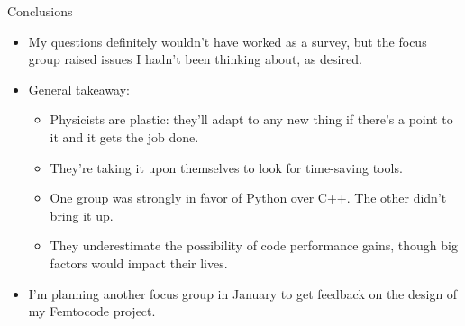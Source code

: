 \documentclass{beamer}
\begin{document}
\begin{frame}{Conclusions}
\vspace{0.25 cm}
\begin{itemize}\setlength{\itemsep}{0.5 cm}
\item My questions definitely wouldn't have worked as a survey, but the focus group raised issues I hadn't been thinking about, as desired.

\item General takeaway:
\begin{itemize}
\item Physicists are plastic: they'll adapt to any new thing if there's a point to it and it gets the job done.
\item They're taking it upon themselves to look for time-saving tools.
\item One group was strongly in favor of Python over C++. The other didn't bring it up.
\item They underestimate the possibility of code performance gains, though big factors would impact their lives.
\end{itemize}

\item I'm planning another focus group in January to get feedback on the design of my Femtocode project.
\end{itemize}
\end{frame}
\end{document}
